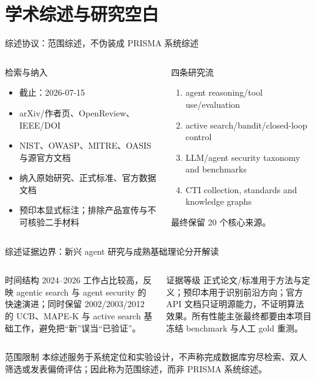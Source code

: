 \section{学术综述与研究空白}

\begin{frame}{综述协议：范围综述，不伪装成 PRISMA 系统综述}
\scriptsize
\begin{columns}[T,onlytextwidth]
\begin{block}{检索与纳入}
\begin{itemize}
  \item 截止：2026-07-15
  \item arXiv/作者页、OpenReview、IEEE/DOI
  \item NIST、OWASP、MITRE、OASIS 与源官方文档
  \item 纳入原始研究、正式标准、官方数据文档
  \item 预印本显式标注；排除产品宣传与不可核验二手材料
\end{itemize}
\end{block}
\begin{block}{四条研究流}
\begin{enumerate}
  \item agent reasoning/tool use/evaluation
  \item active search/bandit/closed-loop control
  \item LLM/agent security taxonomy and benchmarks
  \item CTI collection, standards and knowledge graphs
\end{enumerate}
最终保留 20 个核心来源。
\end{block}
\end{columns}
\end{frame}

\begin{frame}{综述证据边界：新兴 agent 研究与成熟基础理论分开解读}
\small
\begin{columns}[T,onlytextwidth]
\begin{block}{时间结构}
2024--2026 工作占比较高，反映 agentic search 与 agent security 的快速演进；同时保留 2002/2003/2012 的 UCB、MAPE-K 与 active search 基础工作，避免把“新”误当“已验证”。
\end{block}
\begin{block}{证据等级}
正式论文/标准用于方法与定义；预印本用于识别前沿方向；官方 API 文档只证明源能力，不证明算法效果。所有性能主张最终都要由本项目冻结 benchmark 与人工 gold 重测。
\end{block}
\end{columns}

\begin{alertblock}{范围限制}
本综述服务于系统定位和实验设计，不声称完成数据库穷尽检索、双人筛选或发表偏倚评估；因此称为范围综述，而非 PRISMA 系统综述。
\end{alertblock}
\end{frame}

